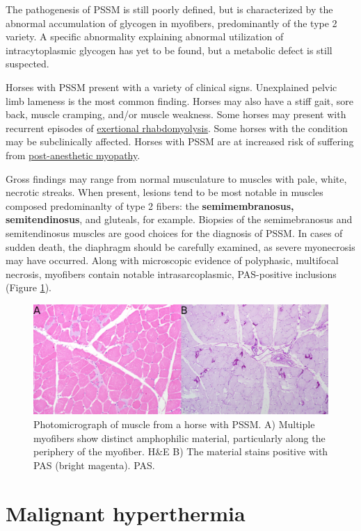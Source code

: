 \documentclass[openany]{report}
\begin{document}
The pathogenesis of PSSM is still poorly defined, but is characterized
by the abnormal accumulation of glycogen in myofibers, predominantly of
the type 2 variety. A specific abnormality explaining abnormal
utilization of intracytoplasmic glycogen has yet to be found, but a
metabolic defect is still suspected.

Horses with PSSM present with a variety of clinical signs. Unexplained
pelvic limb lameness is the most common finding. Horses may also have a
stiff gait, sore back, muscle cramping, and/or muscle weakness. Some
horses may present with recurrent episodes of
\protect\hyperlink{equine-exertional-rhabdomyolysis}{exertional
rhabdomyolysis}. Some horses with the condition may be subclinically
affected. Horses with PSSM are at increased risk of suffering from
\protect\hyperlink{postanesthetic-myopathy-of-horses}{post-anesthetic
myopathy}.

Gross findings may range from normal musculature to muscles with pale,
white, necrotic streaks. When present, lesions tend to be most notable
in muscles composed predominanlty of type 2 fibers: the
\textbf{semimembranosus, semitendinosus}, and gluteals, for example.
Biopsies of the semimebranosus and semitendinosus muscles are good
choices for the diagnosis of PSSM. In cases of sudden death, the
diaphragm should be carefully examined, as severe myonecrosis may have
occurred. Along with microscopic evidence of polyphasic, multifocal
necrosis, myofibers contain notable intrasarcoplasmic, PAS-positive
inclusions (Figure \ref{fig:PSSM}).

\begin{figure}
\centering
\includegraphics{images/PSSM.jpg}
\caption{\label{fig:PSSM}Photomicrograph of muscle from a horse with PSSM.
A) Multiple myofibers show distinct amphophilic material, particularly
along the periphery of the myofiber. H\&E B) The material stains
positive with PAS (bright magenta). PAS.}
\end{figure}

\section{Malignant hyperthermia}\label{malignant-hyperthermia}
\end{document}
